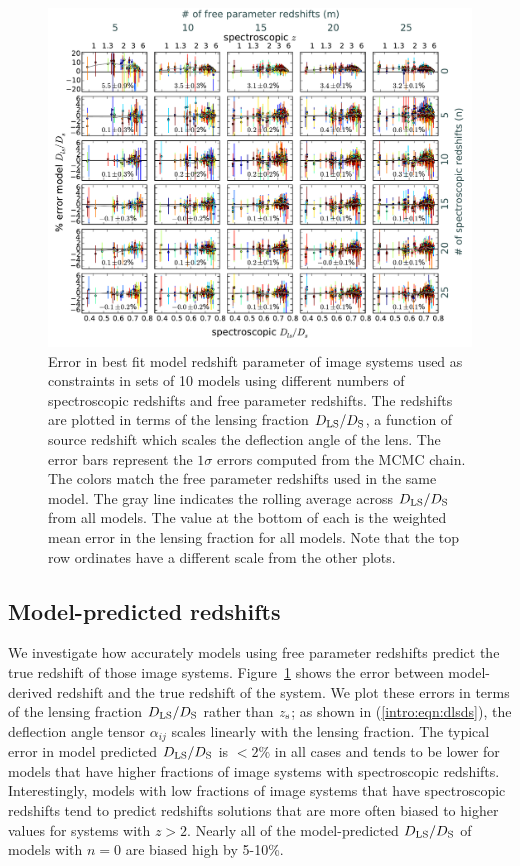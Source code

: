 \begin{figure}
\includegraphics[width=\textwidth]{Chap3/c3f4.pdf}
\caption[Error in redshift parameter of test models]{Error in best fit model redshift parameter of image systems used as constraints in sets of 10 models using different numbers of spectroscopic redshifts and free parameter redshifts. The redshifts are plotted in terms of the lensing fraction $D_\mathrm{LS}/D_\mathrm{S}$, a function of source redshift which scales the deflection angle of the lens. The error bars represent the $1\sigma$ errors computed from the MCMC chain. The colors match the free parameter redshifts used in the same model. The gray line indicates the rolling average across $D_\mathrm{LS}/D_\mathrm{S}$ from all models. The value at the bottom of each is the weighted mean error in the lensing fraction for all models. Note that the top row ordinates have a different scale from the other plots.}
\label{chap3:fig:dlsds}
\end{figure}

\subsection{Model-predicted redshifts}

We investigate how accurately models using free parameter redshifts predict the true redshift of those image systems. Figure~\ref{chap3:fig:dlsds} shows the error between model-derived redshift and the true redshift of the system. We plot these errors in terms of the lensing fraction $D_\mathrm{LS}/D_\mathrm{S}$ rather than $z_\mathrm{s}$; as shown in (\ref{intro:eqn:dlsds}), the deflection angle tensor $\alpha_{ij}$ scales linearly with the lensing fraction. The typical error in model predicted $D_\mathrm{LS}/D_\mathrm{S}$ is $<2\%$ in all cases and tends to be lower for models that have higher fractions of image systems with spectroscopic redshifts. Interestingly, models with low fractions of image systems that have spectroscopic redshifts tend to predict redshifts solutions that are more often biased to higher values for systems with  $z>2$. Nearly all of the model-predicted $D_\mathrm{LS}/D_\mathrm{S}$ of models with $n=0$ are biased high by 5-10\%.

